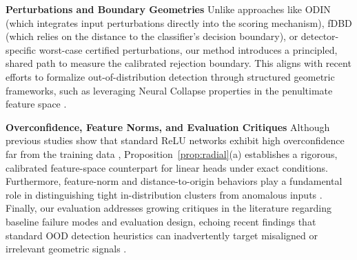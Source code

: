\documentclass[twoside]{article}
\theoremstyle{definition}
\theoremstyle{remark}
\newcommand{\verify}[1]{\textcolor{blue}{[\textbf{CHECK:} #1]}}
\begin{document}
\textbf{Perturbations and Boundary Geometries}
Unlike approaches like ODIN \citep{liang2018enhancing} (which integrates input perturbations directly into the scoring mechanism), fDBD \citep{liu2023detecting} (which relies on the distance to the classifier's decision boundary), or detector-specific worst-case certified perturbations, our method introduces a principled, shared path to measure the calibrated rejection boundary. This aligns with recent efforts to formalize out-of-distribution detection through structured geometric frameworks, such as leveraging Neural Collapse properties in the penultimate feature space \citep{liu2023detecting}.

\textbf{Overconfidence, Feature Norms, and Evaluation Critiques}
Although previous studies show that standard ReLU networks exhibit high overconfidence far from the training data \citep{hein2019relu}, Proposition~\ref{prop:radial}(a) establishes a rigorous, calibrated feature-space counterpart for linear heads under exact conditions. Furthermore, feature-norm and distance-to-origin behaviors play a fundamental role in distinguishing tight in-distribution clusters from anomalous inputs \citep{liu2023detecting}. Finally, our evaluation addresses growing critiques in the literature regarding baseline failure modes and evaluation design, echoing recent findings that standard OOD detection heuristics can inadvertently target misaligned or irrelevant geometric signals \citep{li2025out}.

%




\end{document}
